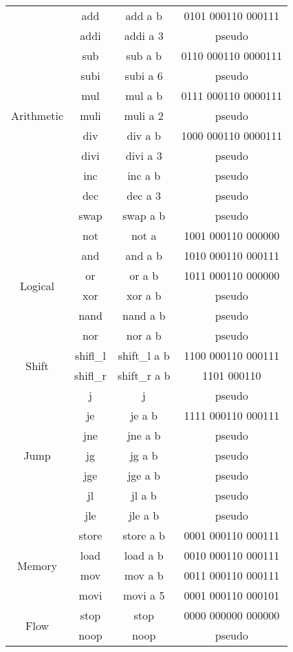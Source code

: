 \documentclass{article}
\begin{document}
\begin{tabular}{|c|c|c|c|}
\hline
\multirow{11}{*}{Arithmetic} & add & add a b & 0101 000110 000111 \\
& addi & addi a 3 & pseudo \\
& sub & sub a b & 0110 000110 0000111\\
& subi & subi a 6 & pseudo\\
& mul & mul a b & 0111 000110 0000111\\
& muli & muli a 2 & pseudo\\
& div & div a b & 1000 000110 0000111\\
& divi & divi a 3 & pseudo\\
& inc & inc a b & pseudo\\
& dec & dec a 3 & pseudo\\
& swap & swap a b & pseudo\\
\hline
\multirow{6}{*}{Logical} & not & not a & 1001 000110 000000\\
& and & and a b & 1010 000110 000111\\
& or & or a b & 1011 000110 000000\\
& xor & xor a b & pseudo\\
& nand & nand a b & pseudo\\
& nor & nor a b & pseudo\\
\hline
\multirow{2}{*}{Shift} & shifl\_l & shift\_l a b & 1100 000110 000111\\
& shifl\_r & shift\_r a b & 1101 000110\\
\hline
\multirow{7}{*}{Jump} & j & j & pseudo \\
& je & je a b & 1111 000110 000111 \\
& jne & jne a b & pseudo \\
& jg & jg a b & pseudo \\
& jge & jge a b & pseudo \\
& jl & jl a b & pseudo \\
& jle & jle a b & pseudo \\
\hline
\multirow{4}{*}{Memory} & store & store a b & 0001 000110 000111\\
& load & load a b & 0010 000110 000111\\
& mov & mov a b & 0011 000110 000111\\
& movi & movi a 5 & 0001 000110 000101\\
\hline
\multirow{2}{*}{Flow} & stop & stop & 0000 000000 000000 \\
& noop & noop & pseudo \\
\hline
\end{tabular}
\end{document}
